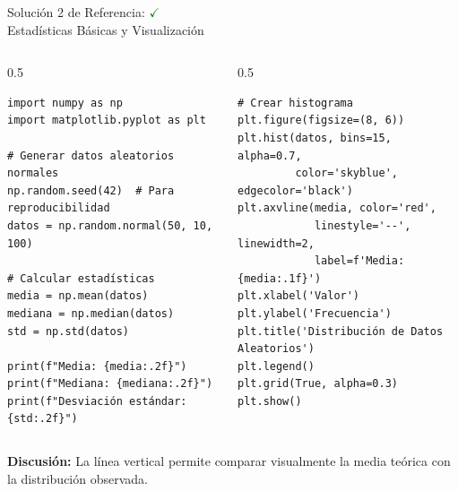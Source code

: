 \documentclass[10pt]{beamer}
\begin{document}
\begin{frame}[fragile]{Solución 2 de Referencia: \hfill \textcolor{green}{$\checkmark$} \\ Estadísticas Básicas y Visualización}
\begin{columns}
\begin{column}{0.5\textwidth}
\begin{verbatim}
import numpy as np
import matplotlib.pyplot as plt

# Generar datos aleatorios normales
np.random.seed(42)  # Para reproducibilidad
datos = np.random.normal(50, 10, 100)

# Calcular estadísticas
media = np.mean(datos)
mediana = np.median(datos)
std = np.std(datos)

print(f"Media: {media:.2f}")
print(f"Mediana: {mediana:.2f}")
print(f"Desviación estándar: {std:.2f}")
\end{verbatim}
\end{column}
\begin{column}{0.5\textwidth}
\begin{verbatim}
# Crear histograma
plt.figure(figsize=(8, 6))
plt.hist(datos, bins=15, alpha=0.7, 
         color='skyblue', edgecolor='black')
plt.axvline(media, color='red', 
            linestyle='--', linewidth=2, 
            label=f'Media: {media:.1f}')
plt.xlabel('Valor')
plt.ylabel('Frecuencia')
plt.title('Distribución de Datos Aleatorios')
plt.legend()
plt.grid(True, alpha=0.3)
plt.show()
\end{verbatim}
\end{column}
\end{columns}
\vspace{0.3cm}
\textbf{Discusión:} La línea vertical permite comparar visualmente la media teórica con la distribución observada.
\end{frame}
\end{document}
